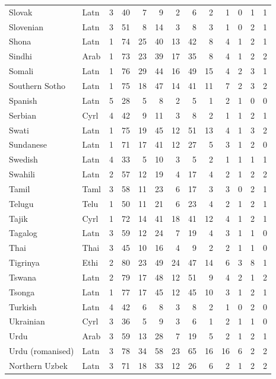 \begin{small}
\begin{longtable}{llrrrrrrrrrrr}
Slovak & Latn & 3 & 40 & 7 & 9 & 2 & 6 & 2 & 1 & 0 & 1 & 1 \\
Slovenian & Latn & 3 & 51 & 8 & 14 & 3 & 8 & 3 & 1 & 0 & 2 & 1 \\
Shona & Latn & 1 & 74 & 25 & 40 & 13 & 42 & 8 & 4 & 1 & 2 & 1 \\
Sindhi & Arab & 1 & 73 & 23 & 39 & 17 & 35 & 8 & 4 & 1 & 2 & 2 \\
Somali & Latn & 1 & 76 & 29 & 44 & 16 & 49 & 15 & 4 & 2 & 3 & 1 \\
Southern Sotho & Latn & 1 & 75 & 18 & 47 & 14 & 41 & 11 & 7 & 2 & 3 & 2 \\
Spanish & Latn & 5 & 28 & 5 & 8 & 2 & 5 & 1 & 2 & 1 & 0 & 0 \\
Serbian & Cyrl & 4 & 42 & 9 & 11 & 3 & 8 & 2 & 1 & 1 & 2 & 1 \\
Swati & Latn & 1 & 75 & 19 & 45 & 12 & 51 & 13 & 4 & 1 & 3 & 2 \\
Sundanese & Latn & 1 & 71 & 17 & 41 & 12 & 27 & 5 & 3 & 1 & 2 & 0 \\
Swedish & Latn & 4 & 33 & 5 & 10 & 3 & 5 & 2 & 1 & 1 & 1 & 1 \\
Swahili & Latn & 2 & 57 & 12 & 19 & 4 & 17 & 4 & 2 & 1 & 2 & 2 \\
Tamil & Taml & 3 & 58 & 11 & 23 & 6 & 17 & 3 & 3 & 0 & 2 & 1 \\
Telugu & Telu & 1 & 50 & 11 & 21 & 6 & 23 & 4 & 2 & 1 & 2 & 1 \\
Tajik & Cyrl & 1 & 72 & 14 & 41 & 18 & 41 & 12 & 4 & 1 & 2 & 1 \\
Tagalog & Latn & 3 & 59 & 12 & 24 & 7 & 19 & 4 & 3 & 1 & 1 & 0 \\
Thai & Thai & 3 & 45 & 10 & 16 & 4 & 9 & 2 & 2 & 1 & 1 & 0 \\
Tigrinya & Ethi & 2 & 80 & 23 & 49 & 24 & 47 & 14 & 6 & 3 & 8 & 1 \\
Tswana & Latn & 2 & 79 & 17 & 48 & 12 & 51 & 9 & 4 & 2 & 1 & 2 \\
Tsonga & Latn & 1 & 77 & 17 & 45 & 12 & 45 & 10 & 3 & 1 & 2 & 1 \\
Turkish & Latn & 4 & 42 & 6 & 8 & 3 & 8 & 2 & 1 & 0 & 2 & 0 \\
Ukrainian & Cyrl & 3 & 36 & 5 & 9 & 3 & 6 & 1 & 2 & 1 & 1 & 0 \\
Urdu & Arab & 3 & 59 & 13 & 28 & 7 & 19 & 5 & 2 & 1 & 2 & 1 \\
Urdu (romanised) & Latn & 3 & 78 & 34 & 58 & 23 & 65 & 16 & 16 & 6 & 2 & 2 \\
Northern Uzbek & Latn & 3 & 71 & 18 & 33 & 12 & 26 & 6 & 2 & 1 & 2 & 2 \\

\end{longtable}
\end{small}
